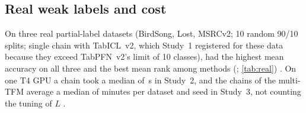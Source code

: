 \subsection{Real weak labels and cost}\label{sec:real}\label{sec:ablation}
On three real partial-label datasets (BirdSong, Lost, MSRCv2; 10 random 90/10 splits; single chain with TabICL~v2,
which Study~1 registered for these data because they exceed TabPFN~v2's limit of 10 classes), \ours{} had the highest
mean accuracy on all three and the best mean rank among
 methods (; \cref{tab:real}) . On one T4 GPU a chain took a median of \,s in Study~2, and the  chains of
the multi-TFM average a median of  minutes per dataset and seed in Study~3, not counting the tuning
of $L$ .
